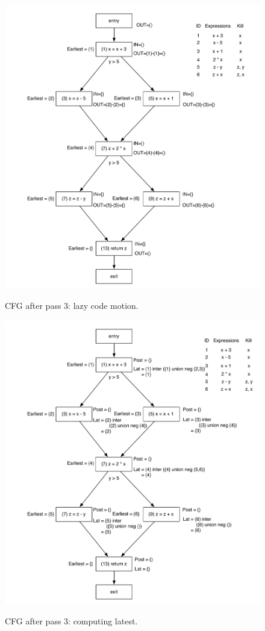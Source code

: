 \documentclass[12pt]{article}
\begin{document}
\begin{figure}[!htbp]
    \centering
    \caption{CFG after pass 3: lazy code motion.}
    \includegraphics[scale=0.65]{cfg4.pdf}
    \label{fig:cfg4}
\end{figure}

\begin{figure}[!htbp]
    \centering
    \caption{CFG after pass 3: computing latest.}
    \includegraphics[scale=0.65]{cfg4_1.pdf}
    \label{fig:cfg4_1}
\end{figure}
\end{document}
